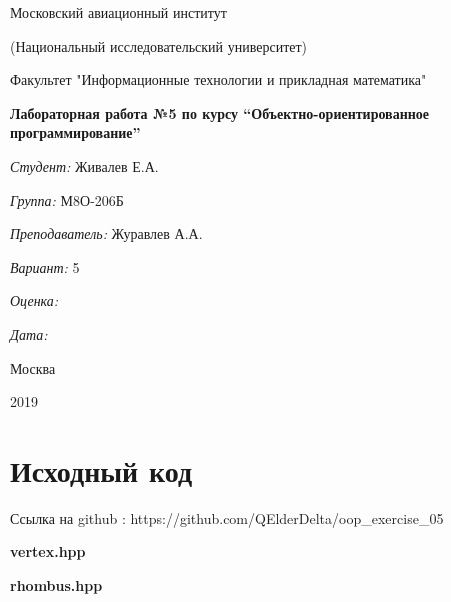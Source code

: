 \documentclass[a4paper, 12pt]{article}
\begin{document}
\thispagestyle{empty}	
\begin{center}
	Московский авиационный институт
	
	(Национальный исследовательский университет)
	
	Факультет "Информационные технологии и прикладная математика"
	
\end{center}
\vspace{40ex}
\begin{center}
	\textbf{\large{Лабораторная работа №5 по курсу \textquotedblleft Объектно-ориентированное программирование\textquotedblright}}
\end{center}
\vspace{40ex}
\begin{flushright}
	\textit{Студент: } Живалев Е.А.
	
	\vspace{2ex}
	\textit{Группа: } М8О-206Б
	
	\vspace{2ex}
	\textit{Преподаватель: } Журавлев А.А.
	
	\vspace{2ex}
	\textit{Вариант: } 5
	
	\vspace{2ex}
	\textit{Оценка: } \underline{\quad\quad\quad\quad\quad\quad}
	
	 \vspace{2ex}
	\textit{Дата: } \underline{\quad\quad\quad\quad\quad\quad}
	
\end{flushright}

\begin{vfill}
	\begin{center}
		Москва
		
		2019
	\end{center}	
\end{vfill}
\newpage
\section{Исходный код}

Ссылка на github : https://github.com/QElderDelta/oop\_exercise\_05

\vspace{3ex}
\textbf{\large{vertex.hpp}}


\vspace{3ex}
\textbf{\large{rhombus.hpp}}

\end{document}
